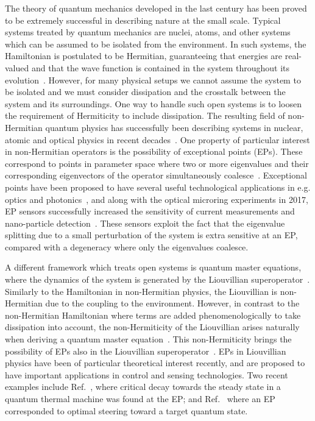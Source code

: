 \documentclass[../main.tex]{subfiles}
\begin{document}
The theory of quantum mechanics developed in the last century has been proved to be extremely successful in describing nature at the small scale. Typical systems treated by quantum mechanics are nuclei, atoms, and other systems which can be assumed to be isolated from the environment. In such systems, the Hamiltonian is postulated to be Hermitian, guaranteeing that energies are real-valued and that the wave function is contained in the system throughout its evolution~\cite{sakurai}. However, for many physical setups we cannot assume the system to be isolated and we must consider dissipation and the crosstalk between the system and its surroundings. One way to handle such open systems is to loosen the requirement of Hermiticity to include dissipation. The resulting field of non-Hermitian quantum physics has successfully been describing systems in nuclear, atomic and optical physics in recent decades~\cite{nonHermrev}. One property of particular interest in non-Hermitian operators is the possibility of exceptional points (EPs). These correspond to points in parameter space where two or more eigenvalues and their corresponding eigenvectors of the operator simultaneously coalesce~\cite{ep_expl}. Exceptional points have been proposed to have several useful technological applications in e.g. optics and photonics~\cite{eptechrev1,eptechrev2}, and along with the optical microring experiments in 2017, EP sensors successfully increased the sensitivity of current measurements and nano-particle detection~\cite{microring1, microring2}. These sensors exploit the fact that the eigenvalue splitting due to a small perturbation of the system is extra sensitive at an EP, compared with a degeneracy where only the eigenvalues coalesce.

A different framework which treats open systems is quantum master equations, where the dynamics of the system is generated by the Liouvillian superoperator~\cite{bookopen}. Similarly to the Hamiltonian in non-Hermitian physics, the Liouvillian is non-Hermitian due to the coupling to the environment. However, in contrast to the non-Hermitian Hamiltonian where terms are added phenomenologically to take dissipation into account, the non-Hermiticity of the Liouvillian arises naturally when deriving a quantum master equation~\cite{compLvsnonH}. This non-Hermiticity brings the possibility of EPs also in the Liouvillian superoperator~\cite{HEPvsLEP}. EPs in Liouvillian physics have been of particular theoretical interest recently, and are proposed to have important applications in control and sensing technologies. Two recent examples include Ref.~\cite{thermal}, where critical decay towards the steady state in a quantum thermal machine was found at the EP; and Ref.~\cite{steering} where an EP corresponded to optimal steering toward a target quantum state.
\end{document}
